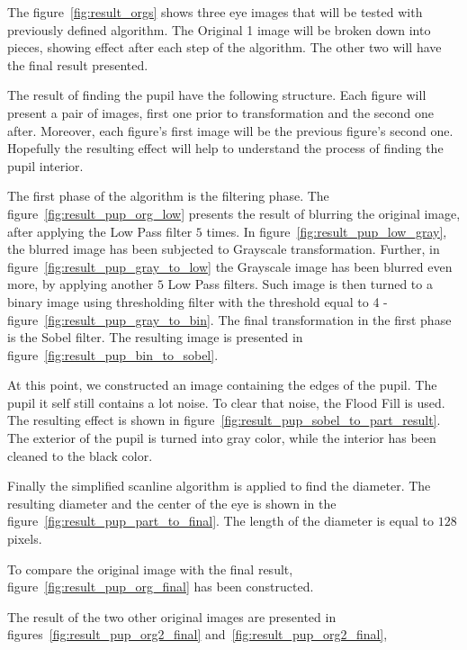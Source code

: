 \documentclass{article}
\begin{document}
The figure~\ref{fig:result_orgs} shows three eye images that will be tested with previously defined algorithm. The Original 1 image will be broken down into pieces, showing effect after each step of the algorithm. The other two will have the final result presented.

The result of finding the pupil have the following structure. Each figure will present a pair of images, first one prior to transformation and the second one after. Moreover, each figure's first image will be the previous figure's second one. Hopefully the resulting effect will help to understand the process of finding the pupil interior.

The first phase of the algorithm is the filtering phase. The figure~\ref{fig:result_pup_org_low} presents the result of blurring the original image, after applying the Low Pass filter $5$ times. In figure~\ref{fig:result_pup_low_gray}, the blurred image has been subjected to Grayscale transformation. Further, in figure~\ref{fig:result_pup_gray_to_low} the Grayscale image has been blurred even more, by applying another $5$ Low Pass filters. Such image is then turned to a binary image using thresholding filter with the threshold equal to 4 - figure~\ref{fig:result_pup_gray_to_bin}. The final transformation in the first phase is the Sobel filter. The resulting image is presented in figure~\ref{fig:result_pup_bin_to_sobel}.

At this point, we constructed an image containing the edges of the pupil. The pupil it self still contains a lot noise. To clear that noise, the Flood Fill is used. The resulting effect is shown in figure~\ref{fig:result_pup_sobel_to_part_result}. The exterior of the pupil is turned into gray color, while the interior has been cleaned to the black color.

Finally the simplified scanline algorithm is applied to find the diameter. The resulting diameter and the center of the eye is shown in the figure~\ref{fig:result_pup_part_to_final}. The length of the diameter is equal to $128$ pixels.

To compare the original image with the final result, figure~\ref{fig:result_pup_org_final} has been constructed.

The result of the two other original images are presented in figures~\ref{fig:result_pup_org2_final} and~\ref{fig:result_pup_org2_final},
\end{document}
